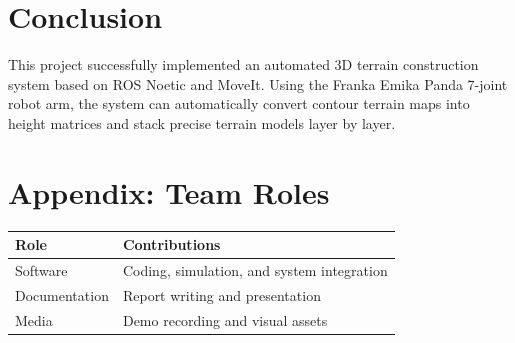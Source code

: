 \documentclass[12pt, a4paper]{article}
\begin{document}
\section{Conclusion}

This project successfully implemented an automated 3D terrain construction system based on ROS Noetic and MoveIt. Using the Franka Emika Panda 7-joint robot arm, the system can automatically convert contour terrain maps into height matrices and stack precise terrain models layer by layer.

\section*{Appendix: Team Roles}

\begin{table}[H]
    \centering
    \begin{tabular}{p{4cm} p{10cm}}
        \toprule
        \textbf{Role} & \textbf{Contributions} \\
        \midrule
        Software & Coding, simulation, and system integration \\
        Documentation & Report writing and presentation \\
        Media & Demo recording and visual assets \\
        \bottomrule
    \end{tabular}
\end{table}
\end{document}
